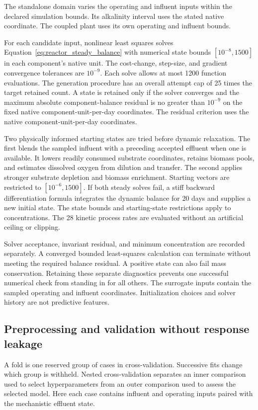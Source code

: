 The standalone domain varies the operating and influent inputs within the declared simulation bounds. Its alkalinity interval uses the stated native coordinate. The coupled plant uses its own operating and influent bounds.

For each candidate input, nonlinear least squares solves Equation~\eqref{eq:reactor_steady_balance} with numerical state bounds $[10^{-8},1500]$ in each component's native unit. The cost-change, step-size, and gradient convergence tolerances are $10^{-9}$. Each solve allows at most 1200 function evaluations. The generation procedure has an overall attempt cap of 25 times the target retained count. A state is retained only if the solver converges and the maximum absolute component-balance residual is no greater than $10^{-9}$ on the fixed native component-unit-per-day coordinates. The residual criterion uses the native component-unit-per-day coordinates.

Two physically informed starting states are tried before dynamic relaxation. The first blends the sampled influent with a preceding accepted effluent when one is available. It lowers readily consumed substrate coordinates, retains biomass pools, and estimates dissolved oxygen from dilution and transfer. The second applies stronger substrate depletion and biomass enrichment. Starting vectors are restricted to $[10^{-6},1500]$. If both steady solves fail, a stiff backward differentiation formula integrates the dynamic balance for 20 days and supplies a new initial state. The state bounds and starting-state restrictions apply to concentrations. The 28 kinetic process rates are evaluated without an artificial ceiling or clipping.

Solver acceptance, invariant residual, and minimum concentration are recorded separately. A converged bounded least-squares calculation can terminate without meeting the required balance residual. A positive state can also fail mass conservation. Retaining these separate diagnostics prevents one successful numerical check from standing in for all others. The surrogate inputs contain the sampled operating and influent coordinates. Initialization choices and solver history are not predictive features.

\subsection{Preprocessing and validation without response leakage}

A fold is one reserved group of cases in cross-validation. Successive fits change which group is withheld. Nested cross-validation separates an inner comparison used to select hyperparameters from an outer comparison used to assess the selected model. Here each case contains influent and operating inputs paired with the mechanistic effluent state.

